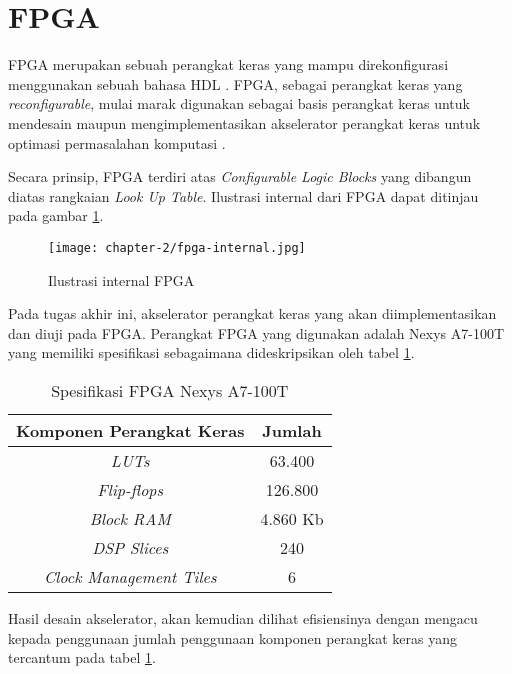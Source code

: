 \section{\acl{FPGA}}
\label{sec:fpga}

\acf{FPGA} merupakan sebuah perangkat keras yang mampu direkonfigurasi menggunakan sebuah bahasa \ac{HDL} \parencite{smith2024FPGA}. \ac{FPGA}, sebagai perangkat keras yang \textit{reconfigurable}, mulai marak digunakan sebagai basis perangkat keras untuk mendesain maupun mengimplementasikan akselerator perangkat keras untuk optimasi permasalahan komputasi \parencite{gerlach2023fpgaplacement}.

Secara prinsip, \ac{FPGA} terdiri atas \textit{Configurable Logic Blocks} yang dibangun diatas rangkaian \textit{Look Up Table}. Ilustrasi internal dari \ac{FPGA} dapat ditinjau pada gambar \ref{fig:ilustrasi-internal-fpga}.

\begin{figure}[h]
	\centering
	\texttt{[image: chapter-2/fpga-internal.jpg]}
	\caption{Ilustrasi internal \ac{FPGA} \parencite{md2015field}}
	\label{fig:ilustrasi-internal-fpga}
\end{figure}

Pada tugas akhir ini, akselerator perangkat keras yang akan diimplementasikan dan diuji pada \ac{FPGA}. Perangkat \ac{FPGA} yang digunakan adalah Nexys A7-100T yang memiliki spesifikasi sebagaimana dideskripsikan oleh tabel \ref{tab:nexys-specs}.

\begin{table}[h]
	\caption{Spesifikasi \ac{FPGA} Nexys A7-100T}
	\label{tab:nexys-specs}
	\vspace{0.25cm}
	\begin{center}
		\begin{tabular}{|c|c|}
			\hline
			Komponen Perangkat Keras        & Jumlah \tabularnewline
			\hline
			\textit{\ac{LUTs}}              & 63.400 \tabularnewline
			\textit{Flip-flops}             & 126.800 \tabularnewline
			\textit{Block \ac{RAM}}         & 4.860 Kb \tabularnewline
			\textit{DSP Slices}             & 240 \tabularnewline
			\textit{Clock Management Tiles} & 6 \tabularnewline
			\hline
		\end{tabular}
	\end{center}
\end{table}

Hasil desain akselerator, akan kemudian dilihat efisiensinya dengan mengacu kepada penggunaan jumlah penggunaan komponen perangkat keras yang tercantum pada tabel \ref{tab:nexys-specs}.
